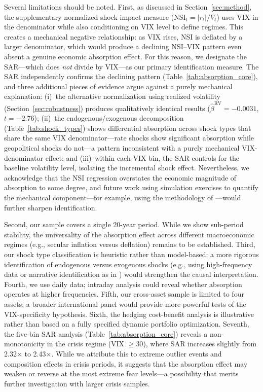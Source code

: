 \documentclass[12pt,a4paper]{article}
\begin{document}
Several limitations should be noted. First, as discussed in Section~\ref{sec:method}, the supplementary normalized shock impact measure ($\text{NSI}_t = |r_t| / V_t$) uses VIX in the denominator while also conditioning on VIX level to define regimes. This creates a mechanical negative relationship: as VIX rises, NSI is deflated by a larger denominator, which would produce a declining NSI--VIX pattern even absent a genuine economic absorption effect. For this reason, we designate the SAR---which does \textit{not} divide by VIX---as our primary identification measure. The SAR independently confirms the declining pattern (Table~\ref{tab:absorption_core}), and three additional pieces of evidence argue against a purely mechanical explanation: (i)~the alternative normalization using realized volatility (Section~\ref{sec:robustness}) produces qualitatively identical results ($\hat{\beta}^{\text{RV}} = -0.0031$, $t = -2.76$); (ii)~the endogenous/exogenous decomposition (Table~\ref{tab:shock_types}) shows differential absorption across shock types that share the same VIX denominator---rate shocks show significant absorption while geopolitical shocks do not---a pattern inconsistent with a purely mechanical VIX-denominator effect; and (iii)~within each VIX bin, the SAR controls for the baseline volatility level, isolating the incremental shock effect. Nevertheless, we acknowledge that the NSI regression overstates the economic magnitude of absorption to some degree, and future work using simulation exercises to quantify the mechanical component---for example, using the methodology of \citet{patton2011}---would further sharpen identification.

Second, our sample covers a single 20-year period. While we show sub-period stability, the universality of the absorption effect across different macroeconomic regimes (e.g., secular inflation versus deflation) remains to be established. Third, our shock type classification is heuristic rather than model-based; a more rigorous identification of endogenous versus exogenous shocks (e.g., using high-frequency data or narrative identification as in \citealt{romer2004}) would strengthen the causal interpretation. Fourth, we use daily data; intraday analysis could reveal whether absorption operates at higher frequencies. Fifth, our cross-asset sample is limited to four assets; a broader international panel would provide more powerful tests of the VIX-specificity hypothesis. Sixth, the hedging cost-benefit analysis is illustrative rather than based on a fully specified dynamic portfolio optimization. Seventh, the five-bin SAR analysis (Table~\ref{tab:absorption_core}) reveals a non-monotonicity in the crisis regime (VIX $\geq 30$), where SAR increases slightly from 2.32$\times$ to 2.43$\times$. While we attribute this to extreme outlier events and composition effects in crisis periods, it suggests that the absorption effect may weaken or reverse at the most extreme fear levels---a possibility that merits further investigation with larger crisis samples.
\end{document}
